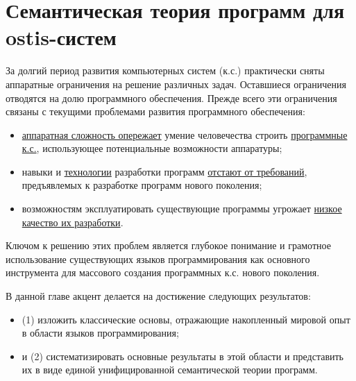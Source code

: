 \chapter{Семантическая теория программ для ostis-систем}
\label{chapter_programs}


За долгий период развития компьютерных систем (к.с.) практически сняты аппаратные ограничения на решение различных задач. Оставшиеся ограничения отводятся на долю программного обеспечения. Прежде всего эти ограничения связаны с текущими проблемами развития программного обеспечения:
\begin{itemize}
    \item \underline{аппаратная сложность опережает} умение человечества строить \underline{программные к.с.}, использующее потенциальные возможности аппаратуры;
    \item навыки и \underline{технологии} разработки программ \underline{отстают от требований}, предъявлемых к разработке программ нового поколения;
    \item возможностям эксплуатировать существующие программы угрожает \underline{низкое качество их разработки}.
\end{itemize}

Ключом к решению этих проблем является глубокое понимание и грамотное использование существующих языков программирования как основного инструмента для массового создания программных к.с. нового поколения.

В данной главе акцент делается на достижение следующих результатов:
\begin{itemize}
    \item (1) изложить классические основы, отражающие накопленный мировой опыт в области языков программирования;
    \item и (2) систематизировать основные результаты в этой области и представить их в виде единой унифицированной семантической теории программ.
\end{itemize}

